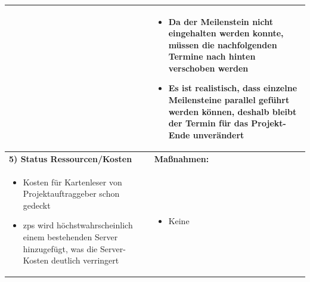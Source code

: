 \begin{center}
\begin{scriptsize}
\begin{tabularx}{\textwidth}{|p{8cm}|X|}
\begin{minipage}{.58\textwidth}
\begin{flushleft}
\begin{itemize}
    \end{itemize}
    \end{flushleft}
    \end{minipage} &
    \begin{minipage}{.4\textwidth} 
    \begin{flushleft}
        \begin{itemize} \vspace{0cm}  
         \item Da der Meilenstein nicht eingehalten werden konnte, müssen die nachfolgenden Termine nach hinten verschoben werden
         \item Es ist realistisch, dass einzelne Meilensteine parallel geführt werden können, deshalb bleibt der Termin für das Projekt-Ende unverändert \vspace{0.2cm}
    \end{itemize}
    \end{flushleft}
    \end{minipage} \\
    \hline
    \textbf{5) Status Ressourcen/Kosten} & \textbf{Maßnahmen:}\\
    \begin{minipage}{.58\textwidth} 
    \begin{flushleft}
        \begin{itemize} \vspace{0cm}  
         \item Kosten für Kartenleser von Projektauftraggeber schon gedeckt
         \item \gls{zps} wird höchstwahrscheinlich einem bestehenden Server hinzugefügt, was die Server-Kosten deutlich verringert \vspace{0.2cm}
    \end{itemize}
    \end{flushleft}
    \end{minipage} &
    \begin{minipage}{.4\textwidth} 
    \begin{flushleft}
        \begin{itemize} \vspace{-0.9cm}  
         \item Keine
    \end{itemize}
    \end{flushleft}
    \end{minipage} \\

\end{tabularx}
\end{scriptsize}
\end{center}
